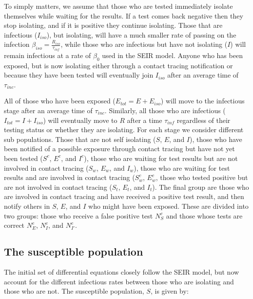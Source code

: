 \documentclass[notitlepage, superscriptaddress]{revtex4-2}
\begin{document}
To simply matters, we assume that those who are tested immediately isolate themselves while waiting for the results. If a test comes back negative then they stop isolating, and if it is positive they continue isolating. Those that are infectious ($I_{iso}$), but isolating, will have a much smaller rate of passing on the infection $\beta_{iso} = \frac{R_{iso}}{\tau_{inf}}$, while those who are infectious but have not isolating ($I$) will remain infectious at a rate of $\beta_{0}$ used in the SEIR model. Anyone who has been exposed, but is now isolating either through a contact tracing notification or because they have been tested will eventually join $I_{iso}$ after an average time of $\tau_{inc}$. 

All of those who have been exposed ($E_{tot} = E + E_{iso}$) will move to the infectious stage after an average time of $\tau_{inc}$. Similarly, all those who are infectious ($I_{tot} =  I + I_{iso}$) will eventually move to $R$ after a time $\tau_{inf}$ regardless of their testing status or whether they are isolating. For each stage we consider different sub populations. Those that are not self isolating ($S$, $E$, and $I$), those who have been notified of a possible exposure through contact tracing but have not yet been tested ($S^{c}$, $E^{c}$, and $I^{c}$), those who are waiting for test results but are not involved in contact tracing ($S_{w}$, $E_{w}$, and $I_{w}$), those who are waiting for test results and are involved in contact tracing ($S^{c}_{w}$, $E^{c}_{w}$, those who tested positive but are not involved in contact tracing ($S_{t}$, $E_{t}$, and $I_{t}$). The final group are those who are involved in contact tracing and have received a positive test result, and then notify others in $S$, $E$, and $I$ who might have been exposed. These are divided into two groups: those who receive a false positive test $N^{c}_{S}$ and those whose tests are correct $N^{c}_{E}$, $N^{c}_{I}$, and $N^{c}_{I'}$.

\subsection{The susceptible population}

The initial set of differential equations closely follow the SEIR model, but now account for the different infectious rates between those who are isolating and those who are not. The susceptible population, $S$, is given by:
\end{document}
